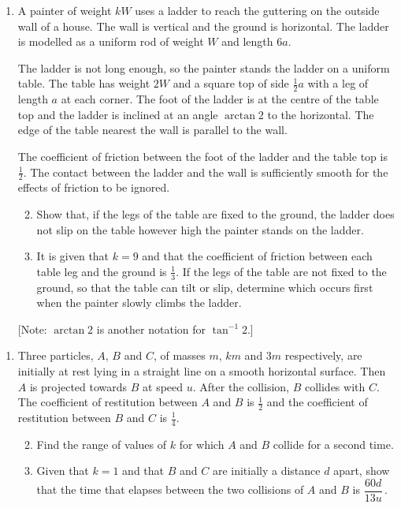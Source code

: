 \documentclass[a4, 11pt]{report}
\newlength{\qspace}
\newcounter{qnumber}
\newenvironment{question}%
 {\vspace{\qspace}
  \begin{enumerate}[\bfseries 1\quad][10]%
    \setcounter{enumi}{\value{qnumber}}%
    \item%
 }
{
  \end{enumerate}
  \filbreak
  \stepcounter{qnumber}
 }
\newenvironment{questionparts}[1][1]%
 {
  \begin{enumerate}[\bfseries (i)]%
    \setcounter{enumii}{#1}
    \addtocounter{enumii}{-1}
    \setlength{\itemsep}{5mm}
    \setlength{\parskip}{8pt}
 }
 {
  \end{enumerate}
 }
\begin{document}
	
\begin{question}
A 
painter of weight $kW$ uses a ladder to reach the guttering on the
outside wall of  a house. The wall is vertical and the ground
is horizontal.
The ladder is modelled as a uniform rod of weight $W$ and length $6a$.


The ladder is not long enough, so the painter
stands the ladder on a uniform table. The table has weight $2W$ and a square 
top of side $\frac12 a$ with  a leg of length $a$ at each corner.
The foot of the ladder is at the centre of the table top and the ladder
is inclined at an angle $\arctan 2$ to the horizontal.
The edge of the table nearest the wall is parallel to the wall.

 The coefficient of friction
between the foot of the ladder and the table top is $\frac12$.
The contact between the ladder and the wall is sufficiently smooth
for the effects of friction to be ignored.

\begin{questionparts}
\item Show that, if the legs of the table are fixed to the ground,
 the ladder does not slip on the table
however high the painter stands on the ladder.
\item It is given that $k=9$  and
that the
coefficient of friction between each table leg 
and the ground is $\frac13$. If the legs of the table are not fixed 
to the ground, 
so that  the table can tilt or slip, determine which 
occurs first when
 the painter slowly climbs the ladder.
\end{questionparts}

[Note: $\arctan 2$ is another notation for $\tan^{-1}2$.]
	\end{question}
	
\begin{question}	
Three particles, $A$, $B$ and $C$, of masses $m$, $km$ and $3m$ respectively,
are initially at rest lying in a straight line on a smooth horizontal surface.
Then $A$ is projected towards  $B$ at speed $u$. After the 
collision, $B$ collides with  $C$. The coefficient of 
restitution between  $A$ and $B$ is $\frac12$ and 
the coefficient of 
restitution between $B$ and $C$ is $\frac14$.

\begin{questionparts}
\item Find the range of values of $k$ for which $A$ and 
$B$ collide for a second time.
\item Given that $k=1$ and that $B$ and $C$ are initially 
a distance $d$ apart, show that 
 the time that elapses between the two collisions 
of $A$ and $B$ is $\dfrac{60d}{13u}\,$.
\end{questionparts}
\end{question}
\end{document}
